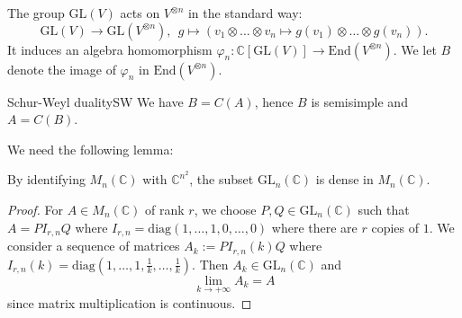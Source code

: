 \documentclass[twoside = false,	%
		headsepline,		%
		parskip = true,
		]{scrbook}						%
\begin{document}
        The group $\mathrm{GL}(V)$ acts on $V^{\otimes n}$ in the standard way:
        $$\mathrm{GL}(V)\to\mathrm{GL}(V^{\otimes n}),\ \ g\mapsto (v_1\otimes\ldots\otimes v_n\mapsto g(v_1)\otimes\ldots\otimes g(v_n)).$$
        It induces an algebra homomorphism $\varphi_n:\mathbb{C}[\mathrm{GL}(V)]\to\mathrm{End}(V^{\otimes n})$.
        We let $B$ denote the image of $\varphi_n$ in $\mathrm{End}(V^{\otimes n})$.
    
        \begin{theorem}{Schur-Weyl duality}{SW}
        We have $B=C(A)$, hence $B$ is semisimple and $A=C(B)$.
        \end{theorem}
    
        We need the following lemma:
    
        \begin{lemma*}{}
            By identifying $M_n(\mathbb{C})$ with $\mathbb{C}^{n^2}$, the subset $\mathrm{GL}_n(\mathbb{C})$ is dense in $M_n(\mathbb{C})$.
        \end{lemma*}
    
        \begin{proof}
            For $A\in M_n(\mathbb{C})$ of rank $r$, we choose $P,Q\in\mathrm{GL}_n(\mathbb{C})$ such that $A=PI_{r,n} Q$ where $I_{r,n}=\mathrm{diag}(1,\ldots,1,0,\ldots,0)$ where there are $r$ copies of $1$. We consider a sequence of matrices $A_k:=PI_{r,n}(k)Q$ where $I_{r,n}(k)=\mathrm{diag}(1,\ldots,1,\frac{1}{k},\ldots,\frac{1}{k})$. Then $A_k\in\mathrm{GL}_n(\mathbb{C})$ and 
            $$\lim_{k\to+\infty} A_k=A$$ 
            since matrix multiplication is continuous.
        \end{proof}
    
\end{document}
